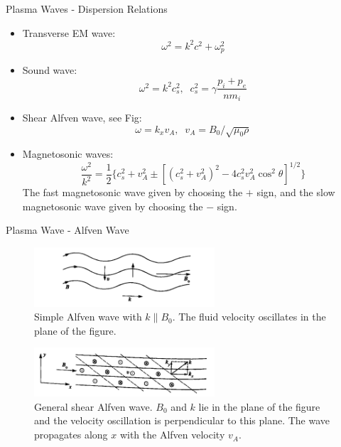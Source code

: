 \begin{frame}{Plasma Waves - Dispersion Relations}
    \begin{itemize}
        \item Transverse EM wave:
              \begin{equation}
                  \omega^2 = k^2c^2 + \omega_p^2
                  \label{eq:transverse-wave}
              \end{equation}
        \item Sound wave:
              \begin{equation}
                  \omega^2 = k^2c_s^2,\;\; c_s^2 = \gamma\frac{p_i + p_e}{nm_i}
                  \label{eq:}
              \end{equation}
        \item Shear Alfven wave, see Fig:
              \begin{equation}
                  \omega = k_xv_A,\;\; v_A = B_0/\sqrt{\mu_0\rho}
                  \label{eq:shear-alfven-wave}
              \end{equation}
        \item Magnetosonic waves:
              \begin{equation}
                  \frac{\omega^2}{k^2} = \frac{1}{2} \{ c_s^2 + v_A^2 \pm [(c_s^2+v_A^2)^2 - 4c_s^2v_A^2\cos^2\theta]^{1/2} \}
                  \label{eq:magnetosonic-wave}
              \end{equation}
              The fast magnetosonic wave given by choosing the $+$ sign, and the slow magnetosonic wave given by choosing the $-$ sign.
    \end{itemize}
\end{frame}

\begin{frame}{Plasma Wave - Alfven Wave}
    \begin{figure}
        \centering
        \includegraphics[width=0.6\textwidth]{figures/simple-alfven-wave.png}
        \caption{Simple Alfven wave with $k\parallel B_0$. The fluid velocity oscillates in the plane of the figure.}
        \label{fig:simple-alfven-wave}
    \end{figure}
    \begin{figure}
        \centering
        \includegraphics[width=0.6\textwidth]{figures/shear-alfven-wave.png}
        \caption{General shear Alfven wave. $B_0$ and $k$ lie in the plane of the figure and the velocity oscillation is perpendicular to this plane. The wave propagates along $x$ with the Alfven velocity $v_A$.}
        \label{fig:shear-alfven-wave}
    \end{figure}
\end{frame}

